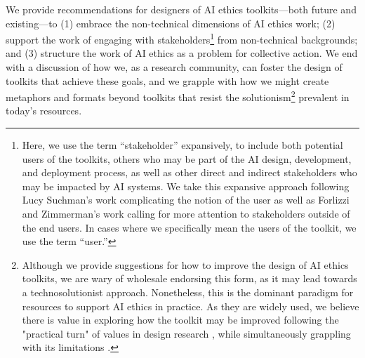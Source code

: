 \documentclass[acmsmall]{acmart}
\begin{document}
We provide recommendations for designers of AI ethics toolkits---both future and existing---to (1) embrace the non-technical
dimensions of AI ethics work; (2) support the work of engaging with
stakeholders\footnote{Here, we use the term ``stakeholder'' expansively, to include both potential users of the toolkits, others who may be part of the AI design, development, and deployment process, as well as other direct and indirect stakeholders who may be impacted by AI systems. We take this expansive approach following Lucy Suchman's work complicating the notion of the user \cite{suchman2002located} as well as Forlizzi and Zimmerman's work calling for more attention to stakeholders outside of the end users\cite{forlizzi2013promoting}. In cases where we specifically mean the users of the toolkit, we use the term ``user.''} from non-technical backgrounds; and (3) structure the work of AI
ethics as a problem for collective action. We end with a discussion of how we, as a research community, can foster the design of toolkits that achieve these goals, and we grapple with how we might
create metaphors and formats beyond toolkits that resist the %
solutionism\footnote{Although we provide suggestions for how to improve the design of AI ethics toolkits, we are wary of wholesale endorsing this form, as it may lead towards a technosolutionist approach. Nonetheless, this is the dominant paradigm for resources to support AI ethics in practice. As they are widely used, we believe there is value in exploring how the toolkit may be improved following the "practical turn" of values in design research \cite{flanagan2014values}, while simultaneously grappling with its limitations \cite[cf.][]{shilton2018values}.} prevalent in today's resources. 

\end{document}

